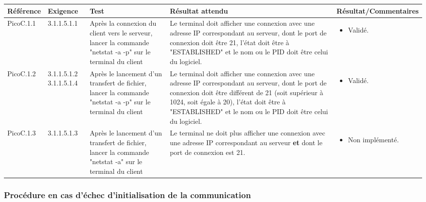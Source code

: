 \documentclass[10pt,a4paper,landscape]{report}
\begin{document}
\begin{center}
	\bgroup
	\def\arraystretch{1.5}
	\begin{tabular}{|p{2.5cm}|p{2cm}|p{8cm}|p{8cm}|p{5cm}|}
		\hline
		\rowcolor{gris}Référence & Exigence & Test & Résultat attendu & Résultat/Commentaires\\
		\hline
		PicoC.1.1 & 3.1.1.5.1.1 & Après la connexion du client vers le serveur, lancer la commande "netstat -a -p" sur le terminal du client & Le terminal doit afficher une connexion avec une adresse IP correspondant au serveur, dont le port de connexion doit être 21, l'état doit être à "ESTABLISHED" et le nom ou le PID doit être celui du logiciel.&\vspace*{-0.2cm} \begin{itemize}[label=$\ast$] \item \textcolor{true}{Validé.}\end{itemize} \\
		\hline
		PicoC.1.2 & 3.1.1.5.1.2 3.1.1.5.1.4 & Après le lancement d'un transfert de fichier, lancer la commande "netstat -a -p" sur le terminal du client & Le terminal doit afficher une connexion avec une adresse IP correspondant au serveur, dont le port de connexion doit être différent de 21 (soit supérieur à 1024, soit égale à 20), l'état doit être à "ESTABLISHED" et le nom ou le PID doit être celui du logiciel. &\vspace*{-0.2cm} \begin{itemize}[label=$\ast$] \item \textcolor{true}{Validé.}\end{itemize} \\
		\hline
		PicoC.1.3 & 3.1.1.5.1.3 & Après le lancement d'un transfert de fichier, lancer la commande "netstat -a" sur le terminal du client & Le terminal ne doit plus afficher une connexion avec une adresse IP correspondant au serveur \textbf{et} dont le port de connexion est 21. &\vspace*{-0.2cm} \begin{itemize}[label=$\ast$] \item \textcolor{false}{Non implémenté.}\end{itemize}\\
		\hline
	\end{tabular}
	\egroup
\end{center}

\subsubsection{Procédure en cas d'échec d'initialisation de la communication}
\end{document}

